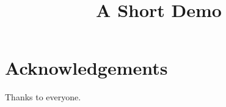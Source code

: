 \documentclass[article]{jss}
\title{A Short Demo}
\begin{document}
\section*{Acknowledgements}
Thanks to everyone.
\end{document}
